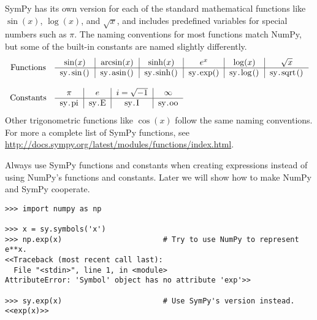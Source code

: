
SymPy has its own version for each of the standard mathematical functions like $\sin(x)$, $\log(x)$, and $\sqrt{x}$, and includes predefined variables for special numbers such as $\pi$.
The naming conventions for most functions match NumPy, but some of the built-in constants are named slightly differently.
\[
\begin{array}{cl}
\text{Functions}
&
\begin{tabular}{c|c|c|c|c|c}
    $\sin(x)$ & $\arcsin(x)$ & $\sinh(x)$ & $e^x$ & $\log(x)$ & $\sqrt{x}$
    \\ \hline
    \li{sy.sin()} & \li{sy.asin()} & \li{sy.sinh()} & \li{sy.exp()} & \li{sy.log()} & \li{sy.sqrt()}
\end{tabular}
\\ \\
\text{Constants}
&
\begin{tabular}{c|c|c|c}
    $\pi$ & $e$ & $i = \sqrt{-1}$ & $\infty$
    \\ \hline
    \li{sy.pi} & \li{sy.E} & \li{sy.I} & \li{sy.oo}
\end{tabular}
\end{array}
\]
Other trigonometric functions like $\cos(x)$ follow the same naming conventions.
For more a complete list of SymPy functions, see \url{http://docs.sympy.org/latest/modules/functions/index.html}.

\begin{warn}
Always use SymPy functions and constants when creating expressions instead of using NumPy's functions and constants.
Later we will show how to make NumPy and SymPy cooperate.
\begin{lstlisting}
>>> import numpy as np

>>> x = sy.symbols('x')
>>> np.exp(x)                       # Try to use NumPy to represent e**x.
<<Traceback (most recent call last):
  File "<stdin>", line 1, in <module>
AttributeError: 'Symbol' object has no attribute 'exp'>>

>>> sy.exp(x)                       # Use SymPy's version instead.
<<exp(x)>>
\end{lstlisting}
\end{warn}

